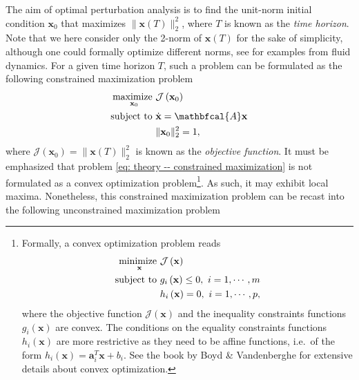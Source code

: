       The aim of optimal perturbation analysis is to find the unit-norm initial condition $\mathbf{x}_0$ that maximizes $\| \mathbf{x}(T) \|_2^2$, where $T$ is known as the \emph{time horizon}. Note that we here consider only the 2-norm of $\mathbf{x}(T)$ for the sake of simplicity, although one could formally optimize different norms, see \cite{??} for examples from fluid dynamics. For a given time horizon $T$, such a problem can be formulated as the following constrained maximization problem
      \begin{equation}
          \begin{aligned}
            \maximize \limits_{\mathbf{x}_0} & \mathcal{J} \left( \mathbf{x}_0 \right) \\
            \subjecto & \dot{\mathbf{x}} = \mathbfcal{A}\mathbf{x} \\
            ~ & \| \mathbf{x}_0 \|_2^2 = 1,
          \end{aligned}
          \label{eq: theory -- constrained maximization}
      \end{equation}
      where $\mathcal{J}(\mathbf{x}_{0}) = \| \mathbf{x}(T) \|_2^2$ is known as the \emph{objective function}. It must be emphasized that problem \eqref{eq: theory -- constrained maximization} is not formulated as a convex optimization problem\footnote{
      Formally, a convex optimization problem reads
      \begin{equation}
        \begin{aligned}
          \operatorname*{minimize~} \limits_{\mathbf{x}} & \mathcal{J} \left( \mathbf{x} \right) \\
          \operatorname{subject~to~} & g_i \left( \mathbf{x} \right) \leq 0, \ i = 1, \cdots, m \\
          ~ & h_i \left( \mathbf{x} \right) = 0, \ i = 1, \cdots, p,
        \end{aligned}
        \notag
      \end{equation}
      where the objective function $\mathcal{J} \left( \mathbf{x} \right)$ and the inequality constraints functions $g_i \left( \mathbf{x} \right)$ are convex. The conditions on the equality constraints functions $h_i \left( \mathbf{x} \right)$ are more restrictive as they need to be affine functions, i.e.\ of the form $h_i \left( \mathbf{x} \right) = \mathbf{a}_i^T \mathbf{x} + b_i$. See the book by Boyd \& Vandenberghe \cite{book:boyd:2004} for extensive details about convex optimization.}.
      As such, it may exhibit local maxima. Nonetheless, this constrained maximization problem can be recast into the following unconstrained maximization problem

